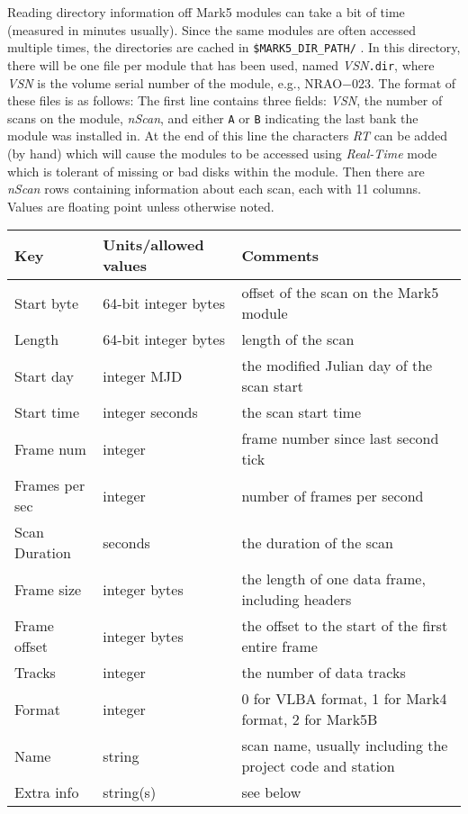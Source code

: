 Reading directory information off Mark5 modules can take a bit of time (measured in minutes usually).
Since the same modules are often accessed multiple times, the directories are cached in {\tt \$MARK5\_DIR\_PATH/} .
In this directory, there will be one file per module that has been used, named {\em VSN}{\tt .dir}, where {\em VSN} is the volume serial number of the module, e.g., NRAO$-$023.
The format of these files is as follows:
The first line contains three fields: {\em VSN}, the number of scans on the module, {\em nScan}, and either {\tt A} or {\tt B} indicating the last bank the module was installed in.
At the end of this line the characters {\em RT} can be added (by hand) which will cause the modules to be accessed using {\em Real-Time} mode which is tolerant of missing or bad disks within the module.
Then there are {\em nScan} rows containing information about each scan, each with 11 columns.
Values are floating point unless otherwise noted.
\begin{center}
\begin{tabular}{l l l}
\hline
Key & Units/allowed values & Comments \\
\hline
Start byte & 64-bit integer bytes & offset of the scan on the Mark5 module \\
Length & 64-bit integer bytes & length of the scan \\
Start day & integer MJD & the modified Julian day of the scan start \\
Start time & integer seconds & the scan start time \\
Frame num & integer & frame number since last second tick \\
Frames per sec & integer & number of frames per second \\
Scan Duration & seconds & the duration of the scan \\
Frame size & integer bytes & the length of one data frame, including headers \\
Frame offset & integer bytes & the offset to the start of the first entire frame \\
Tracks & integer & the number of data tracks \\
Format & integer & 0 for VLBA format, 1 for Mark4 format, 2 for Mark5B \\
Name & string & scan name, usually including the project code and station \\
Extra info & string(s) & see below \\
\hline
\end{tabular}
\end{center}

